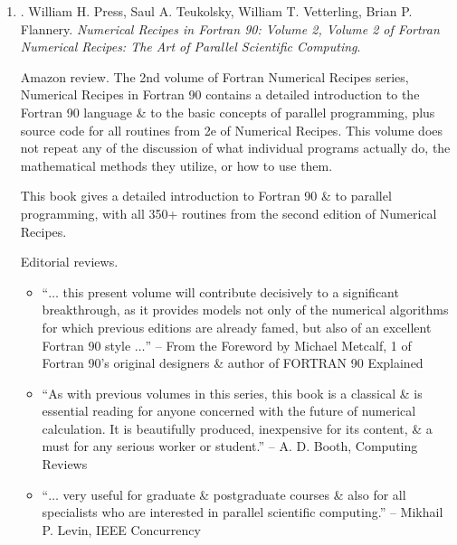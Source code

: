 \documentclass{article}
\begin{document}
\begin{enumerate}
\begin{itemize}
		\item ``$\ldots$ a valuable resource for those with a specific need for numerical software. The routines are prefaced with lucid, self-contained explanations $\ldots$ highly recommended for those who require the use \& understanding of numerical software.'' -- {\sc Elizabeth Greenwell Yanik}, SIAM Review
		\item ``$\ldots$ the 2nd [edition] expands the scopes of covereage \& continues the standard of excellence achieved in the 1st. If you were to have only a single book on numerical methods, this is the one I would recommend.'' -- {\sc Edmund Miller}, IEEE Computational Science \& Engineering
	\end{itemize}

	\item \cite{Press_Teukolsky_Vetterling_Flannery_recipe_Fortran90}. {\sc William H. Press, Saul A. Teukolsky, William T. Vetterling, Brian P. Flannery}. {\it Numerical Recipes in Fortran 90: Volume 2, Volume 2 of Fortran Numerical Recipes: The Art of Parallel Scientific Computing}. {}

	{\sf Amazon review.} The 2nd volume of Fortran Numerical Recipes series, Numerical Recipes in Fortran 90 contains a detailed introduction to the Fortran 90 language \& to the basic concepts of parallel programming, plus source code for all routines from 2e of Numerical Recipes. This volume does not repeat any of the discussion of what individual programs actually do, the mathematical methods they utilize, or how to use them.

	This book gives a detailed introduction to Fortran 90 \& to parallel programming, with all 350+ routines from the second edition of Numerical Recipes.

	{\sf Editorial reviews.}
	\begin{itemize}
		\item ``$\ldots$ this present volume will contribute decisively to a significant breakthrough, as it provides models not only of the numerical algorithms for which previous editions are already famed, but also of an excellent Fortran 90 style $\ldots$'' -- From the Foreword by {\sc Michael Metcalf}, 1 of Fortran 90's original designers \& author of FORTRAN 90 Explained
		\item ``As with previous volumes in this series, this book is a classical \& is essential reading for anyone concerned with the future of numerical calculation. It is beautifully produced, inexpensive for its content, \& a must for any serious worker or student.'' -- {\sc A. D. Booth}, Computing Reviews
		\item ``$\ldots$ very useful for graduate \& postgraduate courses \& also for all specialists who are interested in parallel scientific computing.'' -- {\sc Mikhail P. Levin}, IEEE Concurrency
	\end{itemize}


\end{enumerate}
\end{document}
